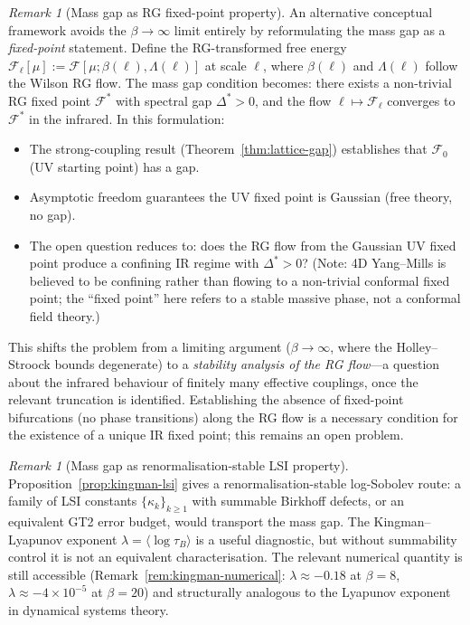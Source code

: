 \documentclass[12pt,a4paper]{article}
\theoremstyle{definition}
\theoremstyle{plain}
\theoremstyle{remark}
\newtheorem{remark}[definition]{Remark}
\begin{document}
\begin{remark}[Mass gap as RG fixed-point property]\label{rem:rg-fixpoint}
An alternative conceptual framework avoids the $\beta \to \infty$ limit
entirely by reformulating the mass gap as a \emph{fixed-point} statement.
Define the RG-transformed free energy
$\mathcal{F}_\ell[\mu] := \mathcal{F}[\mu; \beta(\ell), \Lambda(\ell)]$
at scale $\ell$, where $\beta(\ell)$ and $\Lambda(\ell)$ follow the
Wilson RG flow. The mass gap condition becomes: there exists a
non-trivial RG fixed point $\mathcal{F}^*$ with spectral gap
$\Delta^* > 0$, and the flow $\ell \mapsto \mathcal{F}_\ell$ converges
to $\mathcal{F}^*$ in the infrared. In this formulation:
\begin{itemize}
  \item The strong-coupling result (Theorem~\ref{thm:lattice-gap}) establishes
    that $\mathcal{F}_0$ (UV starting point) has a gap.
  \item Asymptotic freedom guarantees the UV fixed point is Gaussian
    (free theory, no gap).
  \item The open question reduces to: does the RG flow from the Gaussian
    UV fixed point produce a confining IR regime with $\Delta^* > 0$?
    (Note: 4D Yang--Mills is believed to be confining rather than flowing to a non-trivial conformal fixed point; the ``fixed point'' here refers to a stable massive phase, not a conformal field theory.)
\end{itemize}
This shifts the problem from a limiting argument ($\beta \to \infty$,
where the Holley--Stroock bounds degenerate) to a \emph{stability
analysis of the RG flow}---a question about the infrared behaviour
of finitely many effective couplings, once the relevant truncation
is identified. Establishing the absence of fixed-point bifurcations (no phase transitions) along the RG flow
is a necessary condition for the existence of a unique IR
fixed point; this remains an open problem.
\end{remark}

\begin{remark}[Mass gap as renormalisation-stable LSI property]\label{rem:lsi-equivalence}
Proposition~\ref{prop:kingman-lsi} gives a renormalisation-stable
log-Sobolev route: a family of LSI constants $\{\kappa_k\}_{k \geq 1}$
with summable Birkhoff defects, or an equivalent GT2 error budget, would
transport the mass gap. The Kingman--Lyapunov exponent
$\lambda = \langle\log\tau_B\rangle$ is a useful diagnostic, but without
summability control it is not an equivalent characterisation. The relevant
numerical quantity is still accessible
(Remark~\ref{rem:kingman-numerical}: $\lambda \approx -0.18$ at $\beta=8$,
$\lambda \approx -4 \times 10^{-5}$ at $\beta=20$)
and structurally analogous to the Lyapunov exponent in dynamical systems theory.
\end{remark}
\end{document}
